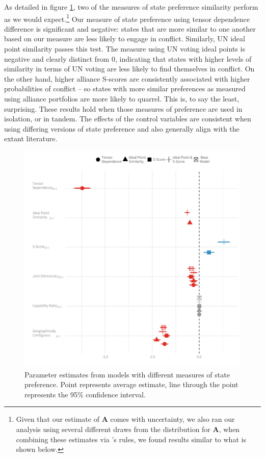\documentclass[12pt,pdflatex]{elsarticle}
\newcommand{\bl}[1]{{\mathbf #1}}
\begin{document}
As detailed in figure \ref{fig:coefP}, two of the measures of state preference similarity perform as we would expect.\footnote{Given that our estimate of $\bl A$ comes with uncertainty, we also ran our analysis using several different draws from the distribution for $\bl A$, when combining these estimates via \citet{rubin:1976}'s rules, we found results similar to what is shown below.}  Our measure of state preference using tensor dependence difference is significant and negative: states that are more similar to one another based on our measure are less likely to engage in conflict. Similarly, UN ideal point similarity passes this test. The measure using UN voting ideal points is negative and clearly distinct from $0$, indicating that states with higher levels of similarity in terms of UN voting are less likely to find themselves in conflict. On the other hand, higher alliance S-scores are consistently associated with higher probabilities of conflict -- so states with more similar preferences as measured using alliance portfolios are more likely to quarrel. This is, to say the least, surprising. These results hold when those measures of preference are used in isolation, or in tandem. The effects of the control variables are consistent when using differing versions of state preference and also generally align with the extant literature.

\begin{figure}[ht]
	\centering
	\includegraphics[width=.7\textwidth]{betaEst}
	\caption{Parameter estimates from models with different measures of state preference. Point represents average estimate, line through the point represents the 95\% confidence interval.}
	\label{fig:coefP}
\end{figure}
\FloatBarrier
\end{document}
